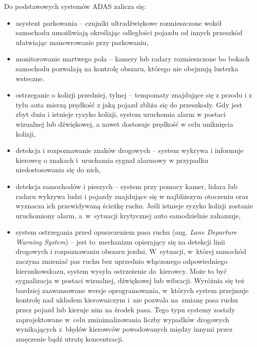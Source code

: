 Do podstawowych systemów ADAS zalicza się:
\begin{itemize}
<<<<<<< HEAD
	\item asystent parkowania -- czujniki ultradźwiękowe rozmieszczone wokół samochodu umożliwiają określając odległości pojazdu od innych przeszkód ułatwiając manewrowanie przy parkowaniu,
	\item monitorowanie martwego pola -- kamery lub radary rozmieszczone bo bokach samochodu pozwalają na kontrolę obszaru, którego nie obejmują lusterka wsteczne.
	\item ostrzeganie o kolizji przedniej, tylnej -- tempomaty znajdujące się z przodu i z tyłu auta mierzą prędkość z jaką pojazd zbliża się do przeszkody. 
	Gdy jest zbyt duża i istnieje ryzyko kolizji, system uruchomia alarm w postaci wizualnej lub dźwiękowej, a nawet dostosuje prędkość w celu uniknięcia kolizji,
	
	\item detekcja i rozpoznawanie znaków drogowych -- system wykrywa i informuje kierowcę o znakach i~uruchamia sygnał alarmowy w przypadku niedostosowania się do nich,
	
	\item detekcja samochodów i pieszych -- system przy pomocy kamer, lidara lub radaru wykrywa ludzi i pojazdy znajdujące się w najbliższym otoczeniu oraz wyznacza ich przewidywaną ścieżkę ruchu. Jeśli istnieje ryzyko kolizji zostanie uruchomiony alarm, a~w~sytuacji krytycznej auto samodzielnie zahamuje,
	
	\item system ostrzegania przed opuszczeniem pasa ruchu (ang. \textit{Lane Departure Warning System}) -- jest to~mechanizm opierający się na detekcji linii drogowych i rozpoznawaniu obszaru jezdni. 
	W~sytuacji, w~której samochód zaczyna zmieniać pas ruchu bez uprzednio włączonego odpowiedniego kierunkowskazu, system wysyła ostrzeżenie do~kierowcy. 
	Może to być sygnalizacja w postaci wizualnej, dźwiękowej lub wibracji. 
	Wyróżnia się też bardziej zaawansowane wersje oprogramowania, w~których system przejmuje kontrolę nad układem kierowniczym i~nie pozwala na~zmianę pasa ruchu przez pojazd lub kieruje nim na środek pasa.
	Tego typu systemy zostały zaprojektowane w~celu zminimalizowania liczby wypadków drogowych wynikających z~błędów kierowców powodowanych między innymi przez zmęczenie bądź utratę koncentracji.
\end{itemize}


